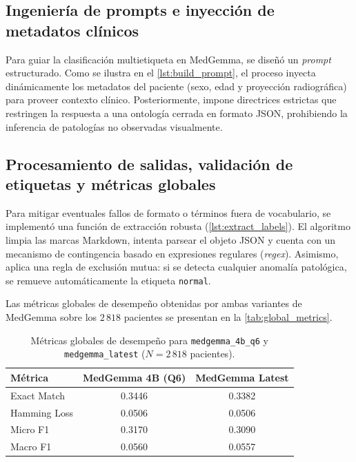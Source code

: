 \documentclass[../tesis.tex]{subfiles}
\begin{document}
\subsection{Ingeniería de prompts e inyección de metadatos clínicos}

Para guiar la clasificación multietiqueta en MedGemma, se diseñó un \textit{prompt} estructurado. Como se ilustra en el \autoref{lst:build_prompt}, el proceso inyecta dinámicamente los metadatos del paciente (sexo, edad y proyección radiográfica) para proveer contexto clínico. Posteriormente, impone directrices estrictas que restringen la respuesta a una ontología cerrada en formato JSON, prohibiendo la inferencia de patologías no observadas visualmente.


\subsection{Procesamiento de salidas, validación de etiquetas y métricas globales}

Para mitigar eventuales fallos de formato o términos fuera de vocabulario, se implementó una función de extracción robusta (\autoref{lst:extract_labels}). El algoritmo limpia las marcas Markdown, intenta parsear el objeto JSON y cuenta con un mecanismo de contingencia basado en expresiones regulares (\textit{regex}). Asimismo, aplica una regla de exclusión mutua: si se detecta cualquier anomalía patológica, se remueve automáticamente la etiqueta \texttt{normal}.


Las métricas globales de desempeño obtenidas por ambas variantes de MedGemma sobre los $2\,818$ pacientes se presentan en la \autoref{tab:global_metrics}.

\begin{table}[htbp]
\centering
\small
\begin{tabular}{lcc}
\hline
\textbf{Métrica} & \textbf{MedGemma 4B (Q6)} & \textbf{MedGemma Latest} \\
\hline
Exact Match   & 0.3446 & 0.3382 \\
Hamming Loss  & 0.0506 & 0.0506 \\
Micro F1      & 0.3170 & 0.3090 \\
Macro F1      & 0.0560 & 0.0557 \\
\hline
\end{tabular}
\caption{Métricas globales de desempeño para \texttt{medgemma\_4b\_q6} y \texttt{medgemma\_latest} ($N = 2\,818$ pacientes).}
\label{tab:global_metrics}
\end{table}
\end{document}

